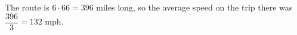 The route is $6\cdot66=396$ miles long, so the average speed on the trip there was $\dfrac{396}{3}=\boxed{132\text{ mph}}$.
